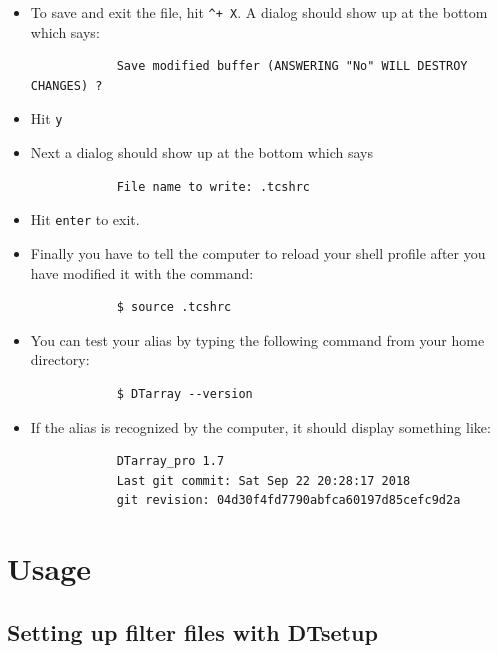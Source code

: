 \documentclass[12pt]{article}
\begin{document}
\begin{itemize}
		\item To save and exit the file, hit \texttt{\textasciicircum + X}. A dialog should show up at the bottom which says: 
		\begin{lstlisting}
			Save modified buffer (ANSWERING "No" WILL DESTROY CHANGES) ?
		\end{lstlisting}
		\item Hit \texttt{y}
		
		\item Next a dialog should show up at the bottom which says 
		
		\begin{lstlisting}
			File name to write: .tcshrc
		\end{lstlisting}
		
		\item Hit \texttt{enter} to exit.
		
		\item Finally you have to tell the computer to reload your shell profile after you have modified it with the command:
		
		\begin{lstlisting}
			$ source .tcshrc
		\end{lstlisting}
		
		\item You can test your alias by typing the following command from your home directory:
		
		\begin{lstlisting}
			$ DTarray --version
		\end{lstlisting}
		
		\item If the alias is recognized by the computer, it should display something like:
		
		\begin{lstlisting}
			DTarray_pro 1.7
			Last git commit: Sat Sep 22 20:28:17 2018
			git revision: 04d30f4fd7790abfca60197d85cefc9d2a
		\end{lstlisting}
		
	\end{itemize}
	
	
	\section{Usage}
	
	\subsection{Setting up filter files with DTsetup} \label{sec:dtsetup}
	
\end{document}

